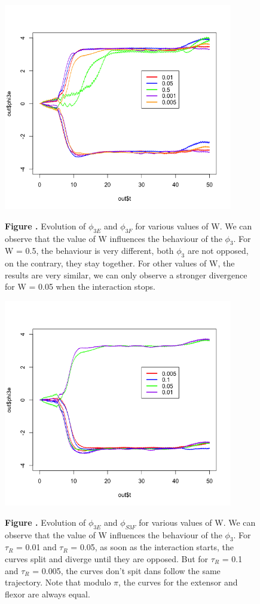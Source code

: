 \documentclass{report}
\begin{document}
\begin{figure}[h!]
\begin{center}
\includegraphics[width=10cm]{figures/varying_W-phi3.png}
\end{center}
 \textbf{\label{fig:05} Figure . }{Evolution of $\phi_{3E}$ and $\phi_{3F}$ for various values of W. We can observe that the value of W influences the behaviour of the $\phi_3$. For W = 0.5, the behaviour is very different, both $\phi_3$ are not opposed, on the contrary, they stay together. For other values of W, the results are very similar, we can only observe a stronger divergence for W = 0.05 when the interaction stops.}
\end{figure}

\begin{figure}[h!]
\begin{center}
\includegraphics[width=10cm]{figures/varying_tauR-phi3.png}
\end{center}
 \textbf{\label{fig:05} Figure . }{Evolution of $\phi_{3E}$ and $\phi_{S3F}$ for various values of W. We can observe that the value of W influences the behaviour of the $\phi_3$. For $\tau_R$ = 0.01 and $\tau_R$ = 0.05, as soon as the interaction starts, the curves split and diverge until they are opposed. But for $\tau_R$ = 0.1 and $\tau_R$ = 0.005, the curves don't spit dans follow the same trajectory. Note that modulo $\pi$, the curves for the extensor and flexor are always equal.}
\end{figure}
\end{document}
